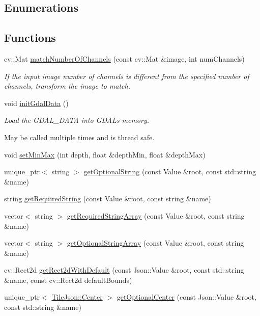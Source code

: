 \subsection*{Enumerations}
\subsection*{Functions}
\begin{DoxyCompactItemize}
\item 
cv\+::\+Mat \hyperlink{group___imagery_module_ga95eb6f615115ac89f33bed1f11861a13}{match\+Number\+Of\+Channels} (const cv\+::\+Mat \&image, int num\+Channels)
\begin{DoxyCompactList}\small\item\em If the input image number of channels is different from the specified number of channels, transform the image to match. \end{DoxyCompactList}\item 
void \hyperlink{group___imagery_module_ga189c04f562d7cd66add6b7cc95bb4b27}{init\+Gdal\+Data} ()
\begin{DoxyCompactList}\small\item\em Load the G\+D\+A\+L\+\_\+\+D\+A\+TA into G\+D\+AL\textquotesingle{}s memory.

May be called multiple times and is thread safe. \end{DoxyCompactList}\item 
void \hyperlink{namespacedg_1_1deepcore_1_1imagery_af97da0ca48f1ad0387fcabc5b3638414}{set\+Min\+Max} (int depth, float \&depth\+Min, float \&depth\+Max)
\item 
unique\+\_\+ptr$<$ string $>$ \hyperlink{namespacedg_1_1deepcore_1_1imagery_a52b9270f0f9ef5ac00dc3731d46df6e6}{get\+Optional\+String} (const Value \&root, const std\+::string \&name)
\item 
string \hyperlink{namespacedg_1_1deepcore_1_1imagery_a7fe14dfc6bcd76f91894900ca0cd4db6}{get\+Required\+String} (const Value \&root, const string \&name)
\item 
vector$<$ string $>$ \hyperlink{namespacedg_1_1deepcore_1_1imagery_aa683178eb392cf39baede76e51f24d12}{get\+Required\+String\+Array} (const Value \&root, const string \&name)
\item 
vector$<$ string $>$ \hyperlink{namespacedg_1_1deepcore_1_1imagery_aa5871533ad39eff0ac77fc48b10334b4}{get\+Optional\+String\+Array} (const Value \&root, const string \&name)
\item 
cv\+::\+Rect2d \hyperlink{namespacedg_1_1deepcore_1_1imagery_abfb515b942ddd9c5cfd5650dd715ffba}{get\+Rect2d\+With\+Default} (const Json\+::\+Value \&root, const std\+::string \&name, const cv\+::\+Rect2d default\+Bounds)
\item 
unique\+\_\+ptr$<$ \hyperlink{structdg_1_1deepcore_1_1imagery_1_1_tile_json_1_1_center}{Tile\+Json\+::\+Center} $>$ \hyperlink{namespacedg_1_1deepcore_1_1imagery_a051e94f679a198b8567c1ac9ad2a9b8d}{get\+Optional\+Center} (const Json\+::\+Value \&root, const std\+::string \&name)
\end{DoxyCompactItemize}



